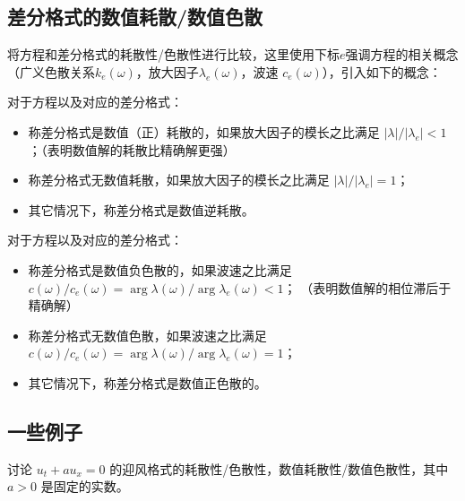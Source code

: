 \subsection{差分格式的数值耗散/数值色散}

将方程和差分格式的耗散性/色散性进行比较，这里使用下标$e$强调方程的相关概念（广义色散关系$k_e(\omega)$，放大因子$\lambda_e(\omega)$，波速 $c_e(\omega)$），引入如下的概念：

\begin{definition}[数值耗散]
    对于方程以及对应的差分格式：
    \begin{itemize}
        \item 称差分格式是数值（正）耗散的，如果放大因子的模长之比满足 $|\lambda| / |\lambda_e| < 1$；（表明数值解的耗散比精确解更强）
        \item 称差分格式无数值耗散，如果放大因子的模长之比满足 $|\lambda| / |\lambda_e| = 1$；
        \item 其它情况下，称差分格式是数值逆耗散。
    \end{itemize}
\end{definition}

\begin{definition}[数值色散]
    对于方程以及对应的差分格式：
    \begin{itemize}
        \item 称差分格式是数值负色散的，如果波速之比满足 $c(\omega) / c_e(\omega) = \arg \lambda(\omega) / \arg \lambda_e(\omega) < 1$；
              （表明数值解的相位滞后于精确解）
        \item 称差分格式无数值色散，如果波速之比满足 $c(\omega) / c_e(\omega) = \arg \lambda(\omega) / \arg \lambda_e(\omega) = 1$；
        \item 其它情况下，称差分格式是数值正色散的。
    \end{itemize}
\end{definition}


\subsection{一些例子}

\begin{example}
    讨论 $u_t + a u_x = 0$ 的迎风格式的耗散性/色散性，数值耗散性/数值色散性，其中 $a > 0$ 是固定的实数。
\end{example}

